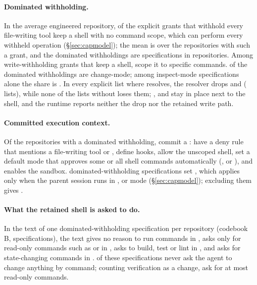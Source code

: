 \paragraph{Dominated withholding.}
In the average engineered repository, \textbf{\RQthreeIncoherentEng{}} of the explicit grants that withhold every
file-writing tool keep a shell with no command scope, which can perform every withheld operation
(\S\ref{sec:capmodel}); the mean is over the \nReposWithhold{} repositories with such a grant, and the dominated
withholdings are \nDomSpecs{} specifications in \nDomRepos{} repositories. Among write-withholding grants that keep a
shell, \RQthreeScopedShare{} scope it to specific commands. \nDomChangeMode{} of the \nDomSpecs{} dominated withholdings
are change-mode; among inspect-mode specifications alone the share is \RQthreeIncoherentInspect{}. In every explicit
list where  resolves, the resolver drops  and  (\RQthreeGrepDroppedResolved{} lists),
while none of the \nGrepListsNoBash{} lists without  loses them; ,  and
 stay in place next to the shell, and the runtime reports neither the drop nor the retained write
path.

\paragraph{Committed execution context.}
Of the \nDomRepos{} repositories with a dominated withholding, \nDomReposSettings{} commit a
: \nDomReposDeny{} have a deny rule that mentions a file-writing tool or ,
\nDomReposHooks{} define hooks, \nDomReposAllowBash{} allow the unscoped shell, \nDomReposNoApprovalMode{} set a default
mode that approves some or all shell commands automatically (,  or
), and \nDomReposSandbox{} enables the sandbox. \nDomPlan{} dominated-withholding
specifications set , which applies only when the parent session runs in ,
 or  mode (\S\ref{sec:capmodel}); excluding them gives \RQthreeIncoherentNoPlan{}.

\paragraph{What the retained shell is asked to do.}
In the text of one dominated-withholding specification per repository (codebook B, \nShellLabelled{} specifications),
the text gives no reason to run commands in \ShellUseNone{}, asks only for read-only commands such as 
or  in \ShellUseInspect{}, asks to build, test or lint in \ShellUseVerify{}, and asks for state-changing
commands in \ShellUseChange{}. \ShellUseNoChangeNeed{} of these specifications never ask the agent to change anything by
command; counting verification as a change, \ShellUseNoneOrInspect{} ask for at most read-only commands.

